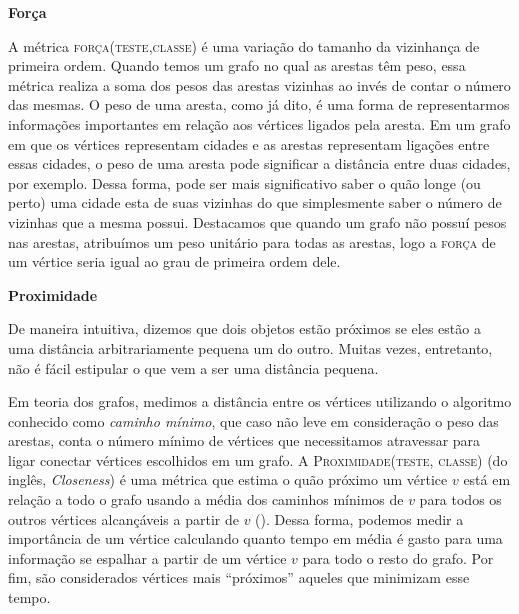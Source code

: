 \begin{description}
\item{\textbf{Força}}
\label{item::strength}

A métrica \textsc{força(teste,classe)} é uma variação do tamanho da vizinhança de primeira ordem. Quando temos um grafo no qual as arestas têm peso, essa métrica realiza a soma dos pesos das arestas vizinhas ao invés de contar o número das mesmas. O peso de uma aresta, como já dito, é uma forma de representarmos informações importantes em relação aos vértices ligados pela aresta. Em um grafo em que os vértices representam cidades e as arestas representam ligações entre essas cidades, o peso de uma aresta pode significar a distância entre duas cidades, por exemplo. Dessa forma, pode ser mais significativo saber o quão longe (ou perto) uma cidade esta de suas vizinhas do que simplesmente saber o número de vizinhas que a mesma possui.
Destacamos que quando um grafo não possuí pesos nas arestas, atribuímos um peso unitário para todas as arestas, logo a \textsc{força} de um vértice seria igual ao grau de primeira ordem dele.

\item{\textbf{Proximidade}}
\label{item::closeness}

De maneira intuitiva, dizemos que dois objetos estão próximos se eles estão a uma distância arbitrariamente pequena um do outro. Muitas vezes, entretanto, não é fácil estipular o que vem a ser uma distância pequena.

Em teoria dos grafos, medimos a distância entre os vértices utilizando o algoritmo conhecido como \textit{caminho mínimo}, que caso não leve em consideração o peso das arestas, conta o número mínimo de vértices que necessitamos atravessar para ligar conectar vértices escolhidos em um grafo. A \textsc{Proximidade(teste, classe)} (do inglês, \textit{Closeness}) é uma métrica que estima o quão próximo um vértice $v$ está em relação a todo o grafo usando a média dos caminhos mínimos de $v$ para todos os outros vértices alcançáveis a partir de $v$ (\cite{Beauchamp65}). Dessa forma, podemos medir a importância de um vértice calculando quanto tempo em média é gasto para uma informação se espalhar a partir de um vértice $v$ para todo o resto do grafo. Por fim, são considerados vértices mais ``próximos'' aqueles que minimizam esse tempo.


\end{description}
